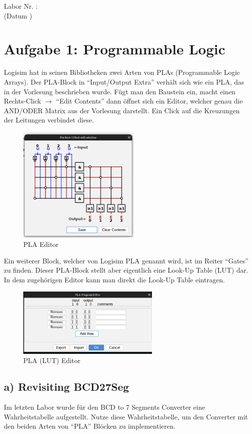 \documentclass[a4paper]{scrartcl}
\def\header#1#2{
  \begin{center}
    {\Large Labor #1: \TOPIC}\\
    {(Datum #2)}
  \end{center}
}
\begin{document}
\header{Nr. \NUMBER}{\DATE}


\section*{Aufgabe 1: Programmable Logic}
Logisim hat in seinen Bibliotheken zwei Arten  von PLAs (Programmable Logic Arrays).
Der PLA-Block in ``Input/Output Extra'' verhält sich wie ein PLA, das in der Vorlesung beschrieben wurde. Fügt man den Baustein ein,
macht einen Rechts-Click $\rightarrow$ ``Edit Contents'' dann öffnet sich ein Editor, welcher genau die AND/ODER Matrix aus der Vorlesung darstellt.
Ein Click auf die Kreuzungen der Leitungen verbindet diese.
\begin{figure}[h]
  \centering
  \includegraphics[width=6cm]{pla_logisim.png}
\caption{PLA Editor}
\end{figure}

Ein weiterer Block, welcher von Logisim PLA genannt wird, ist im Reiter ``Gates'' zu finden. Dieser PLA-Block stellt aber eigentlich
eine Look-Up Table (LUT) dar. In dem zugehörigen Editor kann man direkt die Look-Up Table eintragen.


\begin{figure}[h]
  \centering
  \includegraphics[width=7cm]{lut_editor.png}
\caption{PLA (LUT) Editor}
\end{figure}

\subsection*{a) Revisiting BCD27Seg}
Im letzten Labor wurde für den BCD to 7 Segments Converter eine Wahrheitstabelle aufgestellt. Nutze diese 
Wahrheitstabelle, um den Converter mit den beiden Arten von ``PLA'' Blöcken zu implementieren.\\
\end{document}
